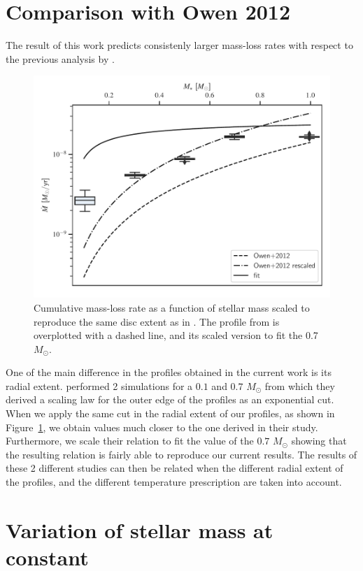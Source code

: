 \documentclass{aa}
\begin{document}
\begin{appendix}
\section{Comparison with Owen 2012}\label{sec:owen}
The result of this work predicts consistenly larger mass-loss rates with respect to the previous analysis by .
\begin{figure}
  \centering
  \includegraphics[width=.5\textwidth]{mdot_comp}
  \caption{Cumulative mass-loss rate as a function of stellar mass scaled to reproduce the same disc extent as in . The profile from  is overplotted with a dashed line, and its scaled version to fit the 0.7 $M_\odot$. \label{fig:mdot_comp}}
\end{figure}
One of the main difference in the profiles obtained in the current work is its radial extent.  performed 2 simulations for a $0.1$ and $0.7$ $M_\odot$ from which they derived a scaling law for the outer edge of the profiles as an exponential cut.
When we apply the same cut in the radial extent of our profiles, as shown in Figure~\ref{fig:mdot_comp}, we obtain values much closer to the one derived in their study. Furthermore, we scale their relation to fit the value of the $0.7$ $M_\odot$ showing that the resulting relation is fairly able to reproduce our current results.
The results of these 2 different studies can then be related when the different radial extent of the profiles, and the different temperature prescription are taken into account.

\section{Variation of stellar mass at constant}

\end{appendix}


{}
\end{document}
